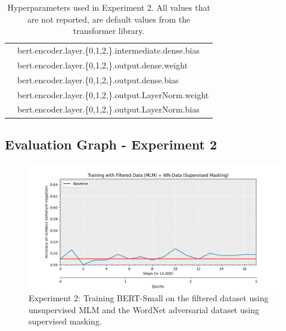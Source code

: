 \documentclass{article}
\begin{document}
\begin{table}[!h]
\begin{tabular}{r|l}
                      &      bert.encoder.layer.\{0,1,2,\}.intermediate.dense.bias \\
                      &      bert.encoder.layer.\{0,1,2,\}.output.dense.weight \\
                      &      bert.encoder.layer.\{0,1,2,\}.output.dense.bias \\
                      &      bert.encoder.layer.\{0,1,2,\}.output.LayerNorm.weight \\
                      &      bert.encoder.layer.\{0,1,2,\}.output.LayerNorm.bias \\
    \end{tabular}
    \caption{Hyperparameters used in Experiment 2. All values that are not reported, are default values from the transformer library.}
    \label{tab:hyp_exp2}
\end{table}

\newpage

\subsection{Evaluation Graph - Experiment 2}

\begin{figure}[!h]
    \centering
    \includegraphics[width=\textwidth]{figures/Training_with_Filtered_Data__MLM____WN_Data__Supervised_Masking_.jpg}
    \caption{Experiment 2: Training BERT-Small on the filtered dataset using unsupervised MLM and the WordNet adversarial dataset using supervised masking.}
    \label{fig:graph_exp2}
\end{figure}
\end{document}
